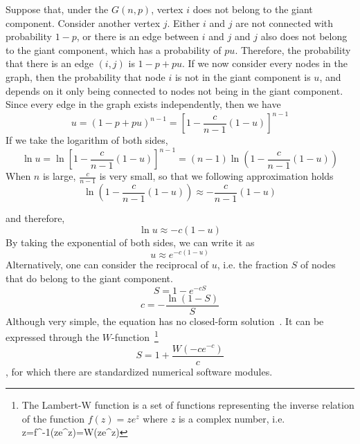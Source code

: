 Suppose that, under the $G(n,p)$, vertex $i$ does not belong to the giant component.
Consider another vertex $j$.
Either $i$ and $j$ are not connected with probability $1-p$, or there is an edge between $i$ and $j$ and $j$ also does not belong to the giant component, which has a probability of $pu$.
Therefore, the probability that there is an edge $(i,j)$ is $1-p + pu$.
If we now consider every nodes in the graph, then the probability that node $i$ is not in the giant component is $u$, and depends on it only being connected to nodes not being in the giant component.
Since every edge in the graph exists independently, then we have
\begin{equation}
	u = (1- p + pu)^{n-1} = \left[ 1 - \frac{c}{n-1} (1-u)\right]^{n-1}
\end{equation}
If we take the logarithm of both sides, 
\begin{equation}
	\ln u = \ln\left[ 1 - \frac{c}{n-1} (1-u)\right]^{n-1} = (n-1) \ln\left( 1-\frac{c}{n-1} (1-u)\right)
\end{equation}
When $n$ is large, $\frac{c}{n-1}$ is very small, so that we following approximation holds
\begin{equation}
	\ln\left( 1-\frac{c}{n-1} (1-u)\right) \approx - \frac{c}{n-1} (1-u)
\end{equation}

and therefore,
\begin{equation}
	\ln u \approx - c (1-u)
\end{equation}
By taking the exponential of both sides, we can write it as
\begin{equation}
	u \approx e^{-c(1-u)}
\end{equation}
Alternatively, one can consider the reciprocal of $u$, i.e. the fraction $S$ of nodes that do belong to the giant component.
\begin{equation}
	S = 1 - e^{-cS}
\end{equation}
\begin{equation}
	c = - \frac{\ln(1-S)}{S}
\end{equation}
\noindent Although very simple, the equation has no closed-form solution~\cite{newman2010networks}.
It can be expressed through the \Lambert $W$-function~\footnote{The Lambert-W function is a set of functions representing the inverse relation of the function $f(z) = z e^{z}$ where $z$ is a complex number, i.e. {\displaystyle\, z=f^{-1}(ze^{z})=W(ze^{z})}}
\begin{equation}
S = 1 + \frac{W(-c e^{-c})}{c}
\label{eq:s_giant_component_lambert}
\end{equation}
\noindent, for which there are standardized numerical software modules.

